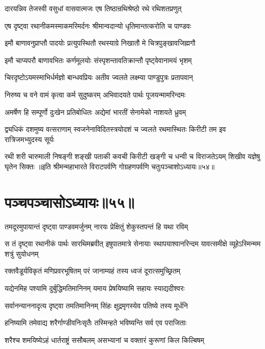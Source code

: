 \twolineshloka
{दारयन्निव तेजस्वी वसुधां वासवात्मजः}
{एष तिष्ठान्रथिश्रेष्ठो रथे रथिशतप्रणुत्}


\twolineshloka
{एष दृष्ट्वा रथानीकमस्माकमरिमर्दनः}
{श्रीमान्वदान्यो धृतिमान्तत्करोति च पाण्डवः}


\twolineshloka
{इमौ बाणावनुप्राप्तौ पादयोः प्रत्युपस्थितौ}
{रथस्याग्रे निखातौ मे चित्रपुङ्खावजिह्मगौ}


\twolineshloka
{इमौ चाप्यपरौ बाणावभितः कर्णमूलयोः}
{संस्पृशन्तावतिक्रान्तौ पृष्ट्वेवानामयं भृशम्}


\twolineshloka
{चिरदृष्टोऽयमस्माभिर्धर्मज्ञो बान्धवप्रियः}
{अतीव ज्वलते लक्ष्म्या पाण्डुपुत्रः प्रतापवान्}


\twolineshloka
{निरुष्य च वने वामं कृत्वा कर्म सुदुष्करम्}
{अभिवादयते पार्थः पूजयन्मामरिन्दमः}


\twolineshloka
{अमर्षेण हि सम्पूर्णो दुःखेन प्रतिबोधितः}
{अद्येमां भारतीं सेनामेको नाशयते ध्रुवम्}

\fourlineindentedshloka
{द्व्यधिकं दशमुष्य वत्सराणाम्}
{स्वजनेनाविदितस्त्रयोदशं च}
{ज्वलते रथमास्थितः किरीटी}
{तम इव रात्रिजमभ्युदस्य सूर्यः}

\fourlineindentedshloka
{रथी शरी चारुमाली निषङ्गी}
{शङ्खी पताकी कवची किरीटी}
{खङ्गी च धन्वी च विराजतेऽयम्}
{शिखीव यज्ञेषु घृतेन सिक्तः}
॥इति श्रीमन्महाभारते विराटपर्वणि गोग्रहणपर्वणि चतुःपञ्चाशोऽध्यायः॥५४॥

\chapter{पञ्चपञ्चासोऽध्यायः॥५५॥}

\twolineshloka
{तमदूरमुपायान्तं दृष्ट्वा पाण्डवमर्जुनम्}
{नारयः प्रेक्षितुं शेकुस्तपन्तं हि यथा रविम्}


\threelineshloka
{स तं दृष्ट्वा रथानीकं पार्थः सारथिमब्रवीत्}
{इषुपातमात्रे सेनायाः स्थापयाश्वानरिन्दम}
{यावत्समीक्षे व्यूहेऽस्मिन्मम शत्रुं सुयोधनम्}


\twolineshloka
{रक्तवैडूर्यविकृतं मणिप्रवरभूषितम्}
{परं जानाम्यहं तस्य ध्वजं दूरात्समुच्छ्रितम्}


\twolineshloka
{यद्येनमिह पश्यामि दुर्बुद्धिमतिमानिनम्}
{यमाय प्रेषयिष्यामि सहायः स्याद्यदीश्वरः}


\twolineshloka
{सर्वानन्याननादृत्य दृष्ट्वा तमतिमानिनम्}
{सिंहः क्षुद्रमृगस्येव पतिष्ये तस्य मूर्धनि}


\twolineshloka
{हनिष्यामि तमेवाद्य शरैर्गाण्डीवनिःसृतैः}
{तस्मिन्हते भविष्यन्ति सर्व एव पराजिताः}


\twolineshloka
{शरैश्च शमयिष्येऽहं धार्तराष्ट्रं ससौबलम्}
{असभ्यानां च वक्तारं कुरूणां किल किल्बिषम्}


